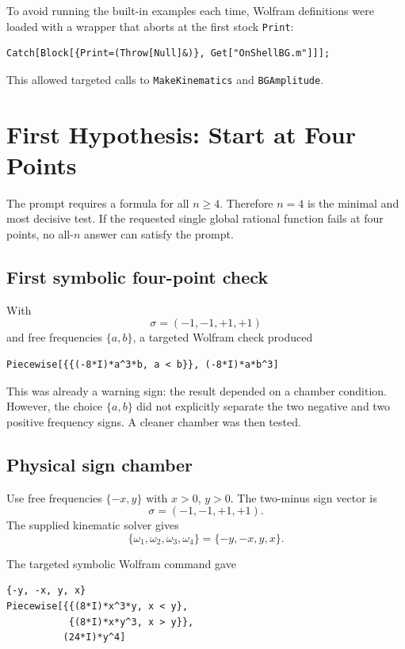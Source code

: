 \documentclass[11pt]{article}
\newcommand{\code}[1]{\texttt{#1}}
\begin{document}
To avoid running the built-in examples each time, Wolfram definitions were
loaded with a wrapper that aborts at the first stock \code{Print}:

\begin{Verbatim}[fontsize=\small]
Catch[Block[{Print=(Throw[Null]&)}, Get["OnShellBG.m"]]];
\end{Verbatim}

This allowed targeted calls to \code{MakeKinematics} and \code{BGAmplitude}.

\section{First Hypothesis: Start at Four Points}

The prompt requires a formula for all \(n\geq4\).  Therefore \(n=4\) is the
minimal and most decisive test.  If the requested single global rational
function fails at four points, no all-\(n\) answer can satisfy the prompt.

\subsection*{First symbolic four-point check}

With
\[
  \sigma=(-1,-1,+1,+1)
\]
and free frequencies \(\{a,b\}\), a targeted Wolfram check produced

\begin{Verbatim}[fontsize=\small]
Piecewise[{{(-8*I)*a^3*b, a < b}}, (-8*I)*a*b^3]
\end{Verbatim}

This was already a warning sign: the result depended on a chamber condition.
However, the choice \(\{a,b\}\) did not explicitly separate the two negative
and two positive frequency signs.  A cleaner chamber was then tested.

\subsection*{Physical sign chamber}

Use free frequencies \(\{-x,y\}\) with \(x>0\), \(y>0\).  The two-minus sign
vector is
\[
  \sigma=(-1,-1,+1,+1).
\]
The supplied kinematic solver gives
\[
  \{\omega_1,\omega_2,\omega_3,\omega_4\}
  =\{-y,-x,y,x\}.
\]

The targeted symbolic Wolfram command gave

\begin{Verbatim}[fontsize=\small]
{-y, -x, y, x}
Piecewise[{{(8*I)*x^3*y, x < y},
           {(8*I)*x*y^3, x > y}},
          (24*I)*y^4]
\end{Verbatim}
\end{document}

